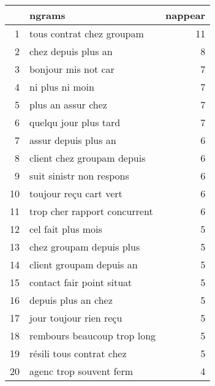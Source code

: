 \begin{tabular}{|r|l|r|}
  \hline
 & ngrams & nappear \\ 
  \hline
1 & tous contrat chez groupam &  11 \\ 
  2 & chez depuis plus an &   8 \\ 
  3 & bonjour mis not car &   7 \\ 
  4 & ni plus ni moin &   7 \\ 
  5 & plus an assur chez &   7 \\ 
  6 & quelqu jour plus tard &   7 \\ 
  7 & assur depuis plus an &   6 \\ 
  8 & client chez groupam depuis &   6 \\ 
  9 & suit sinistr non respons &   6 \\ 
  10 & toujour reçu cart vert &   6 \\ 
  11 & trop cher rapport concurrent &   6 \\ 
  12 & cel fait plus mois &   5 \\ 
  13 & chez groupam depuis plus &   5 \\ 
  14 & client groupam depuis an &   5 \\ 
  15 & contact fair point situat &   5 \\ 
  16 & depuis plus an chez &   5 \\ 
  17 & jour toujour rien reçu &   5 \\ 
  18 & rembours beaucoup trop long &   5 \\ 
  19 & résili tous contrat chez &   5 \\ 
  20 & agenc trop souvent ferm &   4 \\ 
   \hline
\end{tabular}
